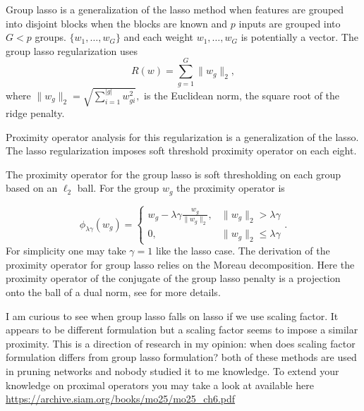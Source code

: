 \documentclass{article}
\def \vahid {\color{magenta}}
\begin{document}
Group lasso is a generalization of the lasso method when features are grouped into disjoint blocks when the blocks are known and $p$ inputs are grouped into $G<p$ groups. $ \{w_{1},\ldots ,w_{G}\}$ and each weight $w_1,\ldots, w_G$ is potentially a vector. The group lasso regularization uses 
$$ R(w)=\sum _{g=1}^{G}\|w_{g}\|_{2},$$
where $\|w_g\|_2 = \sqrt{\sum_{i=1}^{|g|} w_{gi}^2},$ is the Euclidean norm, the square root of the ridge penalty.  

Proximity operator analysis for this regularization is a generalization of the lasso.  The lasso regularization imposes soft threshold  proximity operator on each eight. 

The proximity operator for the group lasso is soft thresholding on each group based on an $\ell_2$ ball. For the group $ w_{g}$ the proximity operator  is 

$$\phi_{\lambda \gamma }(w_{g})=\begin{cases}w_{g}-\lambda \gamma {\frac {w_{g}}{\|w_{g}\|_{2}}},&\|w_{g}\|_{2}>\lambda \gamma \\0,&\|w_{g}\|_{2}\leq \lambda \gamma \end{cases}.$$
For simplicity one may take $\gamma=1$ like the lasso case.
The derivation of the proximity operator for group lasso relies on the Moreau decomposition. Here the proximity operator of the conjugate of the group lasso penalty is a projection onto the ball of a dual norm, see \cite{mosci2010solving} for more details.


{\vahid I am curious to see when group lasso falls on lasso if we use scaling factor. It appears to be different formulation but a scaling factor seems to impose a similar proximity. This is a direction of research in my opinion: when does scaling factor formulation differs from group lasso formulation? both of these methods are used in pruning networks and nobody studied it to me knowledge. To extend your knowledge on proximal operators you may take a look at \cite[Chapter 6]{beck2017first} available here  \url{https://archive.siam.org/books/mo25/mo25_ch6.pdf}} 
\end{document}
